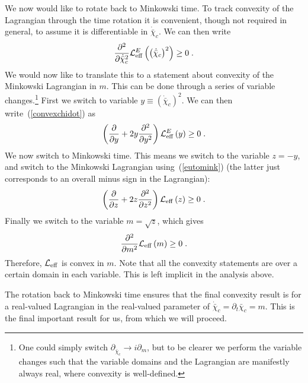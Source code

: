 \documentclass[11pt]{article}
\numberwithin{equation}{section}
\newcommand{\be}{\begin{equation}} \newcommand{\ee}{\end{equation}}
\begin{document}
We now would like to rotate back to Minkowski time. To track convexity of the Lagrangian through the time rotation it is convenient, though not required in general, to assume it is differentiable in $\dot{\bar{\chi}}_c$. We can then write
\be
\frac{\partial^2}{\partial\dot{\bar{\chi}}_c^2} {\cal L}_{\mathrm{eff}}^E\left(\left( \dot{\bar{\chi}}_c\right)^2 \right) \geq 0 \;.
\label{convexchidot}
\ee
We would now like to translate this to a statement about convexity of the Minkowski Lagrangian in $m$. This can be done through a series of variable changes.\footnote{One could simply switch $\partial_{\dot{\bar{\chi}}_c} \rightarrow i \partial_m$, but to be clearer we perform the variable changes such that the variable domains and the Lagrangian are manifestly always real, where convexity is well-defined.} First we switch to variable $y \equiv \left( \dot{\bar{\chi}}_c\right)^2$. We can then write~(\ref{convexchidot}) as
\be
\left(\frac{\partial}{\partial y} + 2 y \frac{\partial^2}{\partial y^2} \right) {\cal L}_{\mathrm{eff}}^E\left(y \right) \geq 0 \;.
\label{convexy}
\ee
We now switch to Minkowski time. This means we switch to the variable $z = -y$, and switch to the Minkowski Lagrangian using~(\ref{eutomink}) (the latter just corresponds to an overall minus sign in the Lagrangian):
\be
\left(\frac{\partial}{\partial z} + 2 z \frac{\partial^2}{\partial z^2} \right) {\cal L}_{\mathrm{eff}}\left(z \right) \geq 0 \;.
\label{convexz}
\ee
Finally we switch to the variable $m = \sqrt{z}$, which gives
\be
\frac{\partial^2}{\partial m^2} {\cal L}_{\mathrm{eff}}\left(m\right) \geq 0 \;.
\ee
Therefore, ${\cal L}_{\mathrm{eff}}$ is convex in $m$. Note that all the convexity statements are over a certain domain in each variable. This is left implicit in the analysis above. 

The rotation back to Minkowski time ensures that the final convexity result is for a real-valued Lagrangian in the real-valued parameter of $\dot{\bar{\chi}}_c = \partial_{t}\bar{\chi}_c = m$. This is the final important result for us, from which we will proceed. 
\end{document}
